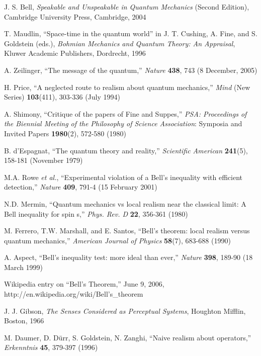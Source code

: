 \documentclass[12pt]{article}
\begin{document}
\begin{thebibliography}{00}

J. S. Bell, \emph{Speakable and Unspeakable in Quantum Mechanics} 
(Second Edition), Cambridge University Press, Cambridge, 2004

T. Maudlin, ``Space-time in the quantum world'' in J. T. Cushing,
A. Fine, and S. Goldstein (eds.), \emph{Bohmian Mechanics and Quantum
Theory: An Appraisal}, Kluwer Academic Publishers, Dordrecht, 1996

A. Zeilinger, ``The message of the quantum,'' \emph{Nature} {\bf{438}},
743 (8 December, 2005)

H. Price, ``A neglected route to realism about quantum mechanics,''
\emph{Mind} (New Series) {\bf{103}}(411), 303-336 (July 1994)


A. Shimony, ``Critique of the papers of Fine and Suppes,'' \emph{PSA:
  Proceedings of the Biennial Meeting of the Philosophy of Science
  Association}:  Symposia and Invited Papers 
  {\bf{1980}}(2), 572-580 (1980)


B. d'Espagnat, ``The quantum theory and reality,'' \emph{Scientific
American} {\bf{241}}(5), 158-181 (November 1979)

M.A. Rowe \emph{et al.}, ``Experimental violation of a Bell's inequality with
efficient detection,'' \emph{Nature} {\bf{409}}, 791-4 (15 February
2001)


N.D. Mermin, ``Quantum mechanics vs local realism near the classical
limit: A Bell inequality for spin s,'' \emph{Phys. Rev. D} {\bf{22}}, 
356-361 (1980)

M. Ferrero, T.W. Marshall, and E. Santos, ``Bell's theorem: local
realism versus quantum mechanics,'' \emph{American Journal of
  Physics} {\bf{58}}(7), 683-688 (1990)


A. Aspect, ``Bell's inequality test: more ideal than ever,''
\emph{Nature} {\bf{398}}, 189-90 (18 March 1999)

Wikipedia entry on ``Bell's Theorem,'' June 9, 2006,
http://en.wikipedia.org/wiki/Bell's\_theorem

J. J. Gibson, \emph{The Senses Considered as Perceptual Systems},
Houghton Mifflin, Boston, 1966

M. Daumer, D. D\"urr, S. Goldstein, N. Zanghi, ``Naive realism about
operators,'' \emph{Erkenntnis} {\bf{45}}, 379-397 (1996)



\end{thebibliography}
\end{document}
